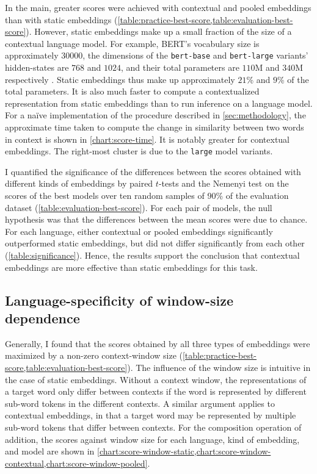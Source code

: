 In the main, greater scores were achieved with contextual and pooled embeddings than
with static embeddings (\cref{table:practice-best-score,table:evaluation-best-score}).
However, static embeddings make up a small fraction of the size of a contextual
language model.
For example, BERT's vocabulary size is approximately $30000$, the dimensions of the
\texttt{bert-base} and \texttt{bert-large} variants' hidden-states are $768$ and
$1024$, and their total parameters are $110$M and $340$M respectively
\parencites[4173-4174]{Devlin2019}.
Static embeddings thus make up approximately $21$\% and $9$\% of the total parameters.
It is also much faster to compute a contextualized representation from static
embeddings than to run inference on a language model.
For a naïve implementation of the procedure described in \cref{sec:methodology}, the
approximate time taken to compute the change in similarity between two words in context
is shown in \cref{chart:score-time}.
It is notably greater for contextual embeddings.
The right-most cluster is due to the \texttt{large} model variants.



I quantified the significance of the differences between the scores obtained with
different kinds of embeddings by paired $t$-tests and the Nemenyi test
\parencites{Demsar2006} on the scores of the best models over ten random samples of
90\% of the evaluation dataset (\cref{table:evaluation-best-score}).
For each pair of models, the null hypothesis was that the differences between the mean
scores were due to chance.
For each language, either contextual or pooled embeddings significantly outperformed
static embeddings, but did not differ significantly from each other
(\cref{table:significance}).
Hence, the results support the conclusion that contextual embeddings are more effective
than static embeddings for this task.



\subsection{Language-specificity of window-size dependence}
\label{sec:language-specificity}

Generally, I found that the scores obtained by all three types of embeddings were
maximized by a non-zero context-window size
(\cref{table:practice-best-score,table:evaluation-best-score}).
The influence of the window size is intuitive in the case of static embeddings.
Without a context window, the representations of a target word only differ between
contexts if the word is represented by different sub-word tokens in the different
contexts.
A similar argument applies to contextual embeddings, in that a target word may be
represented by multiple sub-word tokens that differ between contexts.
For the composition operation of addition, the scores against window size for each
language, kind of embedding, and model are shown in
\cref{chart:score-window-static,chart:score-window-contextual,chart:score-window-pooled}.

